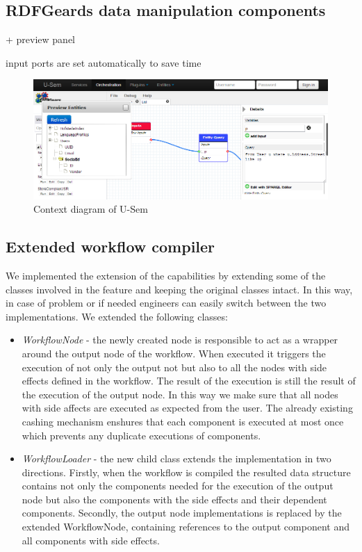 \documentclass[a4paper, notitlepage]{article}
\begin{document}
\subsection{RDFGeards data manipulation components}
+ preview panel

input ports are set automatically to save time

\begin{figure}[h!]
  \centering
  	\includegraphics[scale=0.5]{ui/entityPreview.png}
  \caption{Context diagram of U-Sem }
  \label{fig_context}
\end{figure}

\subsection{Extended workflow compiler}

We implemented the extension of the capabilities by extending some of the classes involved in the feature and keeping the original classes intact. In this way, in case of problem or if needed engineers can easily switch between the two implementations. We extended the following classes:

\begin{itemize}
	\item \textit{WorkflowNode} - the newly created node is responsible to act as a wrapper around the output node of the workflow. When executed it triggers the execution of not only the output not but also to all the nodes with side effects defined in the workflow. The result of the execution is still the result of the execution of the output node. In this way we make sure that all nodes with side affects are executed as expected from the user. The already existing cashing mechanism enshures that each component is executed at most once which prevents any duplicate executions of components.
	
	\item \textit{WorkflowLoader} - the new child class extends the implementation in two directions. Firstly, when the workflow is compiled the resulted data structure contains not only the components needed for the execution of the output node but also the components with the side effects and their dependent components. Secondly, the output node implementations is replaced by the extended WorkflowNode, containing references to the output component and all components with side effects.
\end{itemize}
\end{document}
